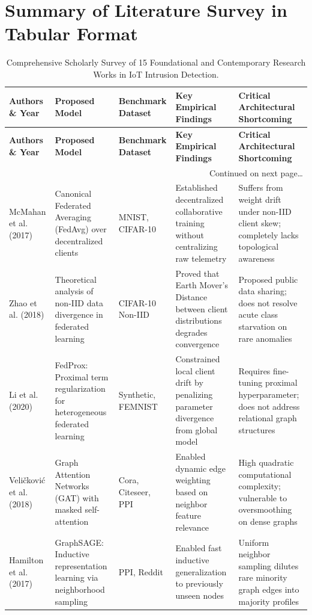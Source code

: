 \documentclass[12pt,a4paper]{report}
\begin{document}
\section{Summary of Literature Survey in Tabular Format}\label{sec:lit_table}
{\setlength{\tabcolsep}{3.5pt}
\begin{longtable}{|p{2.3cm}|p{2.7cm}|p{1.8cm}|p{4.2cm}|p{3.7cm}|}
\caption{Comprehensive Scholarly Survey of 15 Foundational and Contemporary Research Works in IoT Intrusion Detection.}\label{tab:lit_survey}\\
\hline
\textbf{Authors \& Year} & \textbf{Proposed Model} & \textbf{Benchmark Dataset} & \textbf{Key Empirical Findings} & \textbf{Critical Architectural Shortcoming} \\
\hline
\endfirsthead
\hline
\textbf{Authors \& Year} & \textbf{Proposed Model} & \textbf{Benchmark Dataset} & \textbf{Key Empirical Findings} & \textbf{Critical Architectural Shortcoming} \\
\hline
\endhead
\hline \multicolumn{5}{r}{\footnotesize Continued on next page\dots} \\
\endfoot
\hline
\endlastfoot
McMahan et al. (2017) & Canonical Federated Averaging (FedAvg) over decentralized clients & MNIST, CIFAR-10 & Established decentralized collaborative training without centralizing raw telemetry & Suffers from weight drift under non-IID client skew; completely lacks topological awareness \\
\hline
Zhao et al. (2018) & Theoretical analysis of non-IID data divergence in federated learning & CIFAR-10 Non-IID & Proved that Earth Mover's Distance between client distributions degrades convergence & Proposed public data sharing; does not resolve acute class starvation on rare anomalies \\
\hline
Li et al. (2020) & FedProx: Proximal term regularization for heterogeneous federated learning & Synthetic, FEMNIST & Constrained local client drift by penalizing parameter divergence from global model & Requires fine-tuning proximal hyperparameter; does not address relational graph structures \\
\hline
Veli\v{c}kovi\'{c} et al. (2018) & Graph Attention Networks (GAT) with masked self-attention & Cora, Citeseer, PPI & Enabled dynamic edge weighting based on neighbor feature relevance & High quadratic computational complexity; vulnerable to oversmoothing on dense graphs \\
\hline
Hamilton et al. (2017) & GraphSAGE: Inductive representation learning via neighborhood sampling & PPI, Reddit & Enabled fast inductive generalization to previously unseen nodes & Uniform neighbor sampling dilutes rare minority graph edges into majority profiles \\

\end{longtable}}
\end{document}
